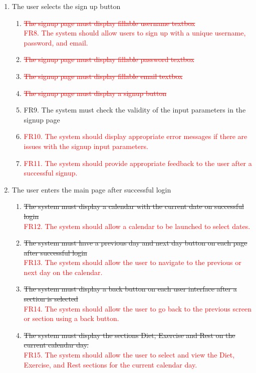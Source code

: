 \documentclass[12pt,letterpaper]{article}
\begin{document}
\begin{enumerate}[{BE}1.]
	\item The user selects the sign up button
	\begin{enumerate}[resume*]
\item {\textcolor{red}{\sout{The signup page must display fillable username textbox}}}
\\{\textcolor{red}{FR8. The system should allow users to sign up with a unique username, password, and email.}}
\item {\textcolor{red}{\sout{The signup page must display fillable password textbox}}}
\item {\textcolor{red}{\sout{The signup page must display fillable email textbox}}}
\item {\textcolor{red}{\sout{The signup page must display a signup button}}}
\item FR9. The system must check the validity of the input parameters in the signup page
\item {\textcolor{red}{FR10. The system should display appropriate error messages if there are issues with the signup input parameters.}}
\item {\textcolor{red}{FR11. The system should provide appropriate feedback to the user after a successful signup.}}
	\end{enumerate}
	
	\item The user enters the main page after successful login
	\begin{enumerate}[resume*]
\item {\color{red}\sout{The system must display a calendar with the current date on successful login}}
\\{\textcolor{red}{FR12. The system should allow a calendar to be launched to select dates.}}
\item {\color{red}\sout{The system must have a previous day and next day button on each page after successful login}}
\\{\textcolor{red}{FR13. The system should allow the user to navigate to the previous or next day on the calendar.}}
\item {\color{red}\sout{The system must display a back button on each user interface after a section is selected}}
\\{\textcolor{red}{FR14. The system should allow the user to go back to the previous screen or section using a back button.}}
\item {\color{red}\sout{The system must display the sections Diet, Exercise and Rest on the current calendar day.}}
\\{\textcolor{red}{FR15. The system should allow the user to select and view the Diet, Exercise, and Rest sections for the current calendar day.}}
	\end{enumerate}
	

\end{enumerate}
\end{document}
